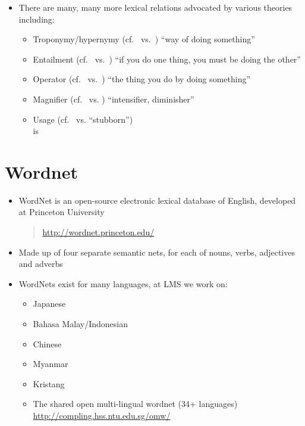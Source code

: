 \documentclass[headrule,footrule]{foils}
\begin{document}
\MyLogo{}
\begin{itemize}
\item There are many, many more lexical relations advocated by various
  theories including:
  \begin{itemize}
  \item Troponymy/hypernymy (cf.\  vs.\ ) 
    ``way of doing something''
  \item Entailment (cf.\  vs.\ ) ``if you do one thing, you must be doing the other''
  \item Operator (cf.\  vs.\ )
    ``the thing you do by doing something''
  \item Magnifier (cf.\  vs. )
    ``intensifier, diminisher''
  \item Usage (cf.\  vs.  ``stubborn'')
    \\  is 
  \end{itemize}
\end{itemize}


\section{Wordnet}




\begin{itemize}
\item WordNet is an open-source electronic lexical database of English,
  developed at Princeton University
  \begin{quote}
    \url{http://wordnet.princeton.edu/}
  \end{quote}
\item Made up of four separate semantic nets, for each of nouns, verbs,
  adjectives and adverbs
\item WordNets exist for many languages, at LMS we work on:
  \begin{itemize}
  \item Japanese 
  \item Bahasa Malay/Indonesian
  \item Chinese
  \item Myanmar
  \item Kristang
  \item The shared open multi-lingual wordnet (34+ languages) 
    \\ \url{http://compling.hss.ntu.edu.sg/omw/}
\end{itemize}
\end{itemize}
\end{document}
